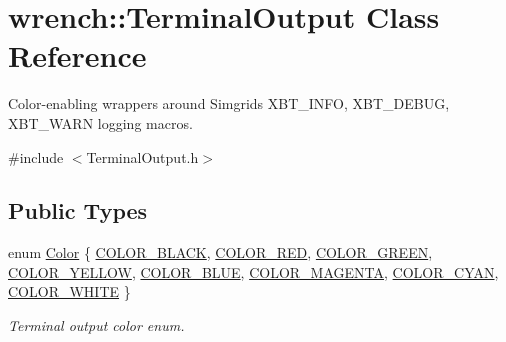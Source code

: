 \hypertarget{classwrench_1_1_terminal_output}{}\section{wrench\+:\+:Terminal\+Output Class Reference}
\label{classwrench_1_1_terminal_output}


Color-\/enabling wrappers around Simgrid\textquotesingle{}s X\+B\+T\+\_\+\+I\+N\+FO, X\+B\+T\+\_\+\+D\+E\+B\+UG, X\+B\+T\+\_\+\+W\+A\+RN logging macros.  




{\ttfamily \#include $<$Terminal\+Output.\+h$>$}

\subsection*{Public Types}
\begin{DoxyCompactItemize}
\item 
enum \hyperlink{classwrench_1_1_terminal_output_a793daa5c24c3613b398f801a75bfa1e0}{Color} \{ \newline
\hyperlink{classwrench_1_1_terminal_output_a793daa5c24c3613b398f801a75bfa1e0a685e549985c21b52315120ecdbdedbd3}{C\+O\+L\+O\+R\+\_\+\+B\+L\+A\+CK}, 
\hyperlink{classwrench_1_1_terminal_output_a793daa5c24c3613b398f801a75bfa1e0aeaae512b70dc3fd7199ee0610e06b365}{C\+O\+L\+O\+R\+\_\+\+R\+ED}, 
\hyperlink{classwrench_1_1_terminal_output_a793daa5c24c3613b398f801a75bfa1e0a7fd5b987f631b43b631941d0955a9949}{C\+O\+L\+O\+R\+\_\+\+G\+R\+E\+EN}, 
\hyperlink{classwrench_1_1_terminal_output_a793daa5c24c3613b398f801a75bfa1e0aec7f1f1d23a5f370415d086d38980b43}{C\+O\+L\+O\+R\+\_\+\+Y\+E\+L\+L\+OW}, 
\newline
\hyperlink{classwrench_1_1_terminal_output_a793daa5c24c3613b398f801a75bfa1e0a0fede0fa90e0ca54f914b8d897470709}{C\+O\+L\+O\+R\+\_\+\+B\+L\+UE}, 
\hyperlink{classwrench_1_1_terminal_output_a793daa5c24c3613b398f801a75bfa1e0a792bd57a9fd44e1a9754b55c6df686a6}{C\+O\+L\+O\+R\+\_\+\+M\+A\+G\+E\+N\+TA}, 
\hyperlink{classwrench_1_1_terminal_output_a793daa5c24c3613b398f801a75bfa1e0aed9315672be90ad25a40e8f39a6313c4}{C\+O\+L\+O\+R\+\_\+\+C\+Y\+AN}, 
\hyperlink{classwrench_1_1_terminal_output_a793daa5c24c3613b398f801a75bfa1e0a745c6187163532ca681a89e925dbce69}{C\+O\+L\+O\+R\+\_\+\+W\+H\+I\+TE}
 \}\begin{DoxyCompactList}\small\item\em Terminal output color enum. \end{DoxyCompactList}
\end{DoxyCompactItemize}
